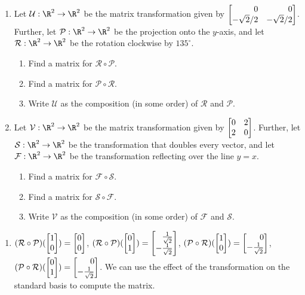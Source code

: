 
\begin{exercises}

	\begin{problist}
		\prob
		\begin{enumerate}
			\item Let $\mathcal U:\R^{2}\to\R^{2}$ be the matrix transformation
				given by $\mat{0&0\\-\sqrt{2}/2 & -\sqrt{2}/2}$. Further,
				let $\mathcal P:\R^{2}\to\R^{2}$ be the projection onto
				the $y$-axis, and let $\mathcal R:\R^{2}\to\R^{2}$ be the rotation
				clockwise by $135^{\circ}$.
				\begin{enumerate}
					\item Find a matrix for $\mathcal R \circ \mathcal
						P$.

					\item Find a matrix for $\mathcal P \circ \mathcal
						R$.

					\item Write $\mathcal U$ as the composition (in some
						order) of $\mathcal R$ and $\mathcal P$.
				\end{enumerate}

			\item Let $\mathcal V:\R^{2}\to\R^{2}$ be the matrix transformation
				given by $\mat{0&2\\2&0}$. Further, let
				$\mathcal S:\R^{2}\to\R^{2}$ be the transformation that
				doubles every vector, and let $\mathcal F:\R^{2}\to\R^{2}$
				be the transformation reflecting over the line $y=x$.
				\begin{enumerate}
					\item Find a matrix for $\mathcal F \circ \mathcal
						S$.

					\item Find a matrix for $\mathcal S \circ \mathcal
						F$.

					\item Write $\mathcal V$ as the composition (in some
						order) of $\mathcal F$ and $\mathcal S$.
				\end{enumerate}
		\end{enumerate}


		\begin{solution}

			\begin{enumerate}
				\item $(\mathcal R \circ \mathcal P)(\mat{1\\0}) = \mat{0\\0}$,
					$(\mathcal R \circ \mathcal P)(\mat{0\\1}) = \mat{\tfrac{1}{\sqrt{2}}\\
					-\tfrac{1}{\sqrt{2}}}$, $(\mathcal P \circ \mathcal
					R)(\mat{1\\0}) = \mat{0\\ -\tfrac{1}{\sqrt{2}}}$,
					$(\mathcal P \circ \mathcal R)(\mat{0\\1}) = \mat{0\\
					- \tfrac{1}{\sqrt{2}}}$. We can use the effect of the
					transformation on the standard basis to compute the
					matrix.



\end{enumerate}
\end{solution}
\end{problist}
\end{exercises}
